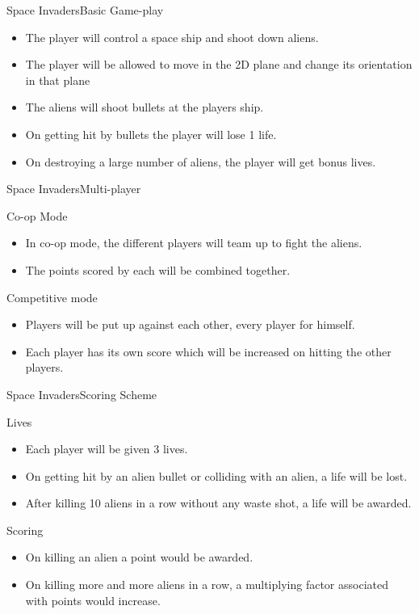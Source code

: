 \documentclass{beamer}
\begin{document}
\begin{frame}{Space Invaders}{Basic Game-play}
  \begin{itemize}
  	\item The player will control a space ship and shoot down aliens.
  	\item The player will be allowed to move in the 2D plane and change its orientation in that plane 
  	\item The aliens will shoot bullets at the players ship.
  	\item On getting hit by bullets the player will lose 1 life.
  	\item On destroying a large number of aliens, the player will get bonus lives.
  \end{itemize}
\end{frame}

\begin{frame}{Space Invaders}{Multi-player}
	\begin{block}{Co-op Mode}
	\begin{itemize}
		\item In co-op mode, the different players will team up to fight the aliens.
		\item The points scored by each will be combined together.
	\end{itemize}
	\end{block}
	\begin{block}{Competitive mode}
	\begin{itemize}
		\item Players will be put up against each other, every player for himself. 
		\item Each player has its own score which will be increased on hitting the other players.
	\end{itemize}  
	\end{block}
\end{frame}

\begin{frame}{Space Invaders}{Scoring Scheme}
	\begin{block}{Lives}
		\begin{itemize}
			\item Each player will be given 3 lives.
			\item On getting hit by an alien bullet or colliding with an alien, a life will be lost.
			\item After killing 10 aliens in a row without any waste shot, a life will be awarded.
		\end{itemize}
	\end{block}
	
	\begin{block}{Scoring}
		\begin{itemize}
			\item On killing an alien a point would be awarded.
			\item On killing more and more aliens in a row, a multiplying factor associated with points would increase.
		\end{itemize}
	\end{block}
\end{frame}
\end{document}
